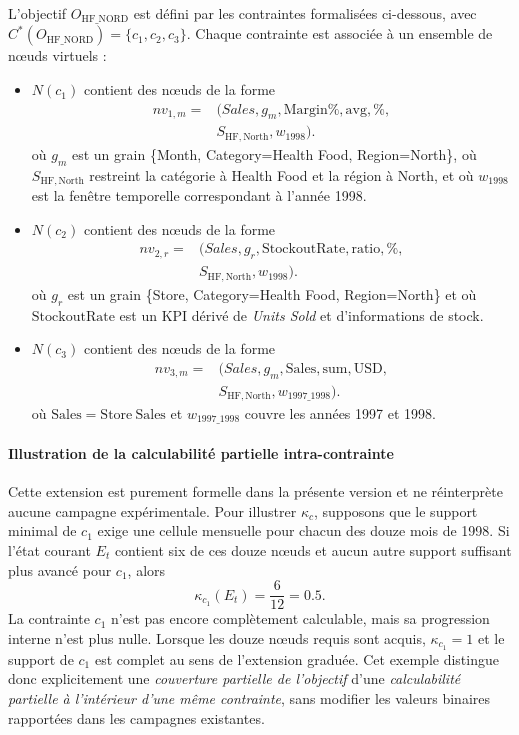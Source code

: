 L'objectif $O_{\mathrm{HF\_NORD}}$ est défini par les contraintes formalisées ci-dessous, avec $C^*(O_{\mathrm{HF\_NORD}})=\{c_1,c_2,c_3\}$. Chaque contrainte est associée à un ensemble de nœuds virtuels :
\begin{itemize}
  \item $N(c_1)$ contient des nœuds de la forme
  \[
  \begin{aligned}
  nv_{1,m}={}&(\textit{Sales},g_m,\mathrm{Margin\%},\mathrm{avg},\%,\\
             &S_{\mathrm{HF,North}},w_{1998}).
  \end{aligned}
  \]
  où $g_m$ est un grain \{Month, Category=Health Food, Region=North\}, où $S_{\mathrm{HF,North}}$ restreint la catégorie à Health Food et la région à North, et où $w_{1998}$ est la fenêtre temporelle correspondant à l'année 1998.
  \item $N(c_2)$ contient des nœuds de la forme
  \[
  \begin{aligned}
  nv_{2,r}={}&(\textit{Sales},g_r,\mathrm{StockoutRate},\mathrm{ratio},\%,\\
             &S_{\mathrm{HF,North}},w_{1998}).
  \end{aligned}
  \]
  où $g_r$ est un grain \{Store, Category=Health Food, Region=North\} et où $\mathrm{StockoutRate}$ est un KPI dérivé de \textit{Units Sold} et d'informations de stock.
  \item $N(c_3)$ contient des nœuds de la forme
  \[
  \begin{aligned}
  nv_{3,m}={}&(\textit{Sales},g_m,\mathrm{Sales},\mathrm{sum},\text{USD},\\
             &S_{\mathrm{HF,North}},w_{1997\_1998}).
  \end{aligned}
  \]
  où $\mathrm{Sales}=\mathrm{Store\ Sales}$ et $w_{1997\_1998}$ couvre les années 1997 et 1998.
\end{itemize}

\paragraph*{Illustration de la calculabilité partielle intra-contrainte}
Cette extension est purement formelle dans la présente version et ne réinterprète aucune campagne expérimentale. Pour illustrer $\kappa_c$, supposons que le support minimal de $c_1$ exige une cellule mensuelle pour chacun des douze mois de 1998. Si l'état courant $E_t$ contient six de ces douze nœuds et aucun autre support suffisant plus avancé pour $c_1$, alors
\[
\kappa_{c_1}(E_t)=\frac{6}{12}=0.5.
\]
La contrainte $c_1$ n'est pas encore complètement calculable, mais sa progression interne n'est plus nulle. Lorsque les douze nœuds requis sont acquis, $\kappa_{c_1}=1$ et le support de $c_1$ est complet au sens de l'extension graduée. Cet exemple distingue donc explicitement une \emph{couverture partielle de l'objectif} d'une \emph{calculabilité partielle à l'intérieur d'une même contrainte}, sans modifier les valeurs binaires rapportées dans les campagnes existantes.

